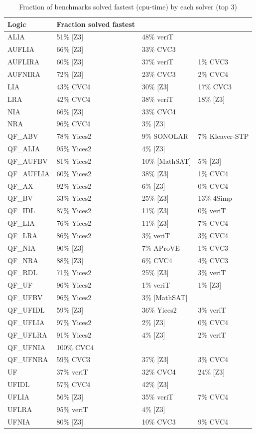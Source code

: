 \documentclass[twoside,11pt]{article}
\begin{document}
\begin{table}
\caption{Fraction of benchmarks solved fastest (cpu-time) by each solver (top 3)}
\label{tab:speed}
\centering\begin{tabular}{|l|lll|}
\hline
Logic & Fraction solved fastest & & \\ \hline
ALIA & 51\% [Z3] & 48\% veriT  & \\
AUFLIA & 66\% [Z3] & 33\% CVC3  & \\
AUFLIRA & 60\% [Z3] & 37\% veriT & 1\% CVC3 \\
AUFNIRA & 72\% [Z3] & 23\% CVC3 & 2\% CVC4 \\
LIA & 43\% CVC4 & 30\% [Z3] & 17\% CVC3 \\
LRA & 42\% CVC4 & 38\% veriT & 18\% [Z3] \\
NIA & 66\% [Z3] & 33\% CVC4  & \\
NRA & 96\% CVC4 & 3\% [Z3]  & \\
QF\_ABV & 78\% Yices2 & 9\% SONOLAR & 7\% Kleaver-STP \\
QF\_ALIA & 95\% Yices2 & 4\% [Z3] & \\
QF\_AUFBV & 81\% Yices2 & 10\% [MathSAT] & 5\% [Z3] \\
QF\_AUFLIA & 60\% Yices2 & 38\% [Z3] & 1\% CVC4 \\
QF\_AX & 92\% Yices2 & 6\% [Z3] & 0\% CVC4 \\
QF\_BV & 33\% Yices2 & 25\% [Z3] & 13\% 4Simp \\
QF\_IDL & 87\% Yices2 & 11\% [Z3] & 0\% veriT \\
QF\_LIA & 76\% Yices2 & 11\% [Z3] & 7\% CVC4 \\
QF\_LRA & 86\% Yices2 & 3\% veriT & 3\% CVC4 \\
QF\_NIA & 90\% [Z3] & 7\% AProVE & 1\% CVC3 \\
QF\_NRA & 88\% [Z3] & 6\% CVC4 & 4\% CVC3 \\
QF\_RDL & 71\% Yices2 & 25\% [Z3] & 3\% veriT \\
QF\_UF & 96\% Yices2 & 1\% veriT & 1\% [Z3] \\
QF\_UFBV & 96\% Yices2 & 3\% [MathSAT]  & \\
QF\_UFIDL & 59\% [Z3] & 36\% Yices2 & 3\% veriT \\
QF\_UFLIA & 97\% Yices2 & 2\% [Z3] & 0\% CVC4 \\
QF\_UFLRA & 91\% Yices2 & 4\% [Z3] & 2\% veriT \\
QF\_UFNIA & 100\% CVC4 & & \\
QF\_UFNRA & 59\% CVC3 & 37\% [Z3] & 3\% CVC4 \\
UF & 37\% veriT & 32\% CVC4 & 24\% [Z3] \\
UFIDL & 57\% CVC4 & 42\% [Z3]  & \\
UFLIA & 56\% [Z3] & 35\% veriT & 7\% CVC4 \\
UFLRA & 95\% veriT & 4\% [Z3]  & \\
UFNIA & 80\% [Z3] & 10\% CVC3 & 9\% CVC4 \\

\hline
\end{tabular}
\end{table}
\end{document}
